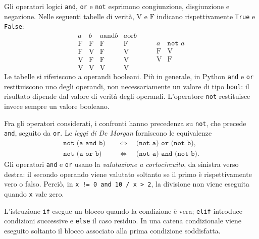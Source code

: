 Gli operatori logici \texttt{and}, \texttt{or} e \texttt{not} esprimono
congiunzione, disgiunzione e negazione. Nelle seguenti tabelle di verità,
\(\mathrm{V}\) e \(\mathrm{F}\) indicano rispettivamente
\texttt{True} e \texttt{False}:
\[
\begin{array}{cc|cc}
  a & b & a\mathbin{\texttt{ and }}b & a\mathbin{\texttt{ or }}b\\
  \hline
  \mathrm{F} & \mathrm{F} & \mathrm{F} & \mathrm{F}\\
  \mathrm{F} & \mathrm{V} & \mathrm{F} & \mathrm{V}\\
  \mathrm{V} & \mathrm{F} & \mathrm{F} & \mathrm{V}\\
  \mathrm{V} & \mathrm{V} & \mathrm{V} & \mathrm{V}
\end{array}
\qquad
\begin{array}{c|c}
  a & \texttt{not }a\\
  \hline
  \mathrm{F} & \mathrm{V}\\
  \mathrm{V} & \mathrm{F}
\end{array}
\]
Le tabelle si riferiscono a operandi booleani. Più in generale, in
Python \texttt{and} e \texttt{or} restituiscono uno degli operandi,
non necessariamente un valore di tipo \texttt{bool}: il risultato
dipende dal valore di verità degli operandi. L'operatore \texttt{not}
restituisce invece sempre un valore booleano.

Fra gli operatori considerati, i confronti hanno precedenza su
\texttt{not}, che precede \texttt{and}, seguito da \texttt{or}.
Le \emph{leggi di De Morgan} forniscono le equivalenze
\[
\begin{aligned}
 \texttt{not (a and b)}&\quad\Longleftrightarrow\quad
 \texttt{(not a) or (not b)},\\
 \texttt{not (a or b)}&\quad\Longleftrightarrow\quad
 \texttt{(not a) and (not b)}.
\end{aligned}
\]
Gli operatori \texttt{and} e \texttt{or} usano la
\emph{valutazione a cortocircuito}, da sinistra verso destra:
il secondo operando viene valutato soltanto se il primo è
rispettivamente vero o falso. Perciò, in
\lstinline|x != 0 and 10 / x > 2|, la divisione non viene eseguita
quando \texttt{x} vale zero.

L'istruzione \texttt{if} esegue un blocco quando la condizione è vera;
\texttt{elif} introduce condizioni successive e \texttt{else} il caso
residuo. In una catena condizionale viene eseguito soltanto il blocco
associato alla prima condizione soddisfatta.



